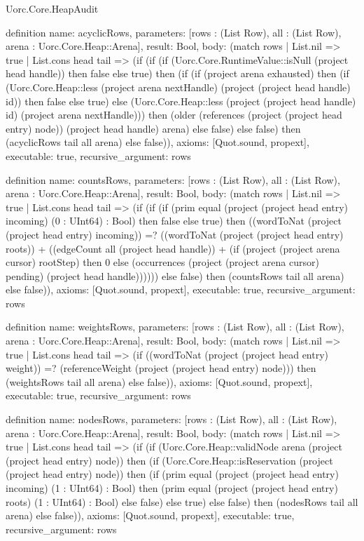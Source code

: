 \begin{lexlean}{Uorc.Core.HeapAudit}
\begin{semanticmodule}
definition{
  name: acyclicRows,
  parameters: [rows : (List Row), all : (List Row), arena : Uorc.Core.Heap::Arena],
  result: Bool,
  body: (match rows
    | List.nil => true
    | List.cons head tail => (if (if (if (Uorc.Core.RuntimeValue::isNull (project head handle)) then false else true) then (if (if (project arena exhausted) then (if (Uorc.Core.Heap::less (project arena nextHandle) (project (project head handle) id)) then false else true) else (Uorc.Core.Heap::less (project (project head handle) id) (project arena nextHandle))) then (older (references (project (project head entry) node)) (project head handle) arena) else false) else false) then (acyclicRows tail all arena) else false)),
  axioms: [Quot.sound, propext],
  executable: true,
  recursive_argument: rows
}

definition{
  name: countsRows,
  parameters: [rows : (List Row), all : (List Row), arena : Uorc.Core.Heap::Arena],
  result: Bool,
  body: (match rows
    | List.nil => true
    | List.cons head tail => (if (if (if (prim equal (project (project head entry) incoming) (0 : UInt64) : Bool) then false else true) then ((wordToNat (project (project head entry) incoming)) =? ((wordToNat (project (project head entry) roots)) + ((edgeCount all (project head handle)) + (if (project (project arena cursor) rootStep) then 0 else (occurrences (project (project arena cursor) pending) (project head handle)))))) else false) then (countsRows tail all arena) else false)),
  axioms: [Quot.sound, propext],
  executable: true,
  recursive_argument: rows
}

definition{
  name: weightsRows,
  parameters: [rows : (List Row), all : (List Row), arena : Uorc.Core.Heap::Arena],
  result: Bool,
  body: (match rows
    | List.nil => true
    | List.cons head tail => (if ((wordToNat (project (project head entry) weight)) =? (referenceWeight (project (project head entry) node))) then (weightsRows tail all arena) else false)),
  axioms: [Quot.sound, propext],
  executable: true,
  recursive_argument: rows
}

definition{
  name: nodesRows,
  parameters: [rows : (List Row), all : (List Row), arena : Uorc.Core.Heap::Arena],
  result: Bool,
  body: (match rows
    | List.nil => true
    | List.cons head tail => (if (if (Uorc.Core.Heap::validNode arena (project (project head entry) node)) then (if (Uorc.Core.Heap::isReservation (project (project head entry) node)) then (if (prim equal (project (project head entry) incoming) (1 : UInt64) : Bool) then (prim equal (project (project head entry) roots) (1 : UInt64) : Bool) else false) else true) else false) then (nodesRows tail all arena) else false)),
  axioms: [Quot.sound, propext],
  executable: true,
  recursive_argument: rows
}


\end{semanticmodule}
\end{lexlean}
